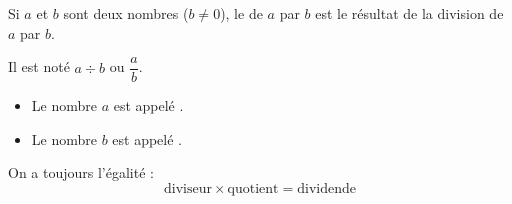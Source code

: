Si $a$ et $b$ sont deux nombres ($b\neq 0$), le  de $a$ par
$b$ est le résultat de la division de $a$ par $b$.
\smallskip\par\noindent
Il est noté $a\div b$ ou $\dfrac{a}{b}$.
\begin{itemize}
    \item Le nombre $a$ est appelé .
    \item Le nombre $b$ est appelé .
\end{itemize}
On a toujours l'égalité :
$$\text{diviseur}\times\text{quotient}=\text{dividende}$$